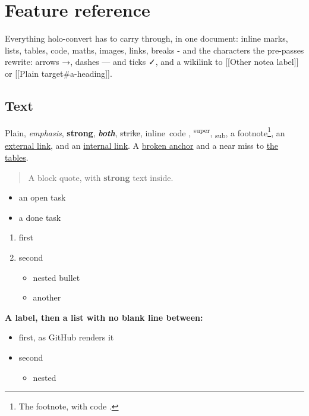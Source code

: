 \documentclass[
]{article}
\author{}
\date{}
\providecommand{\tightlist}{%
  \setlength{\itemsep}{0pt}\setlength{\parskip}{0pt}}
\renewcommand{\texttt}[1]{%
  \colorbox{termbg}{{\ttfamily\relsize{-1}\color{termfg}#1}}%
}
\begin{document}
\renewcommand*\contentsname{Contents}
{
\hypersetup{linkcolor=}
\setcounter{tocdepth}{2}
\tableofcontents
}
\section{Feature reference}\label{feature-reference}

Everything holo-convert has to carry through, in one document: inline
marks, lists, tables, code, maths, images, links, breaks - and the
characters the pre-passes rewrite: arrows →, dashes --- and ticks ✓, and
a wikilink to {[}{[}Other note\textbar a label{]}{]} or {[}{[}Plain
target\#a-heading{]}{]}.

\subsection{Text}\label{text}

Plain, \emph{emphasis}, \textbf{strong}, \textbf{\emph{both}},
\st{strike}, \texttt{inline\ code}, \textsuperscript{super},
\textsubscript{sub}, a footnote\footnote{The footnote, with
  \texttt{code}.}, an \href{https://example.org}{external link}, and an
\hyperref[tables]{internal link}. A \hyperref[nowhere-at-all]{broken
anchor} and a near miss to \hyperref[tabels]{the tables}.

\begin{quote}
A block quote, with \textbf{strong} text inside.
\end{quote}

\begin{itemize}
\tightlist
\item[$\square$]
  an open task
\item[$\boxtimes$]
  a done task
\end{itemize}

\begin{enumerate}
\def\labelenumi{\arabic{enumi}.}
\tightlist
\item
  first
\item
  second

  \begin{itemize}
  \tightlist
  \item
    nested bullet
  \item
    another
  \end{itemize}
\end{enumerate}

\textbf{A label, then a list with no blank line between:}

\begin{itemize}
\tightlist
\item
  first, as GitHub renders it
\item
  second

  \begin{itemize}
  \tightlist
  \item
    nested
  \end{itemize}
\end{itemize}
\end{document}
